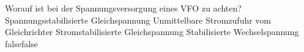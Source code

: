     {Worauf ist bei der Spannungsversorgung eines VFO zu achten?}
    {Spannungsstabilisierte Gleichspannung}
    {Unmittelbare Stromzufuhr vom Gleichrichter}
    {Stromstabilisierte Gleichspannung}
    {Stabilisierte Wechselspannung}
    {false}{false}